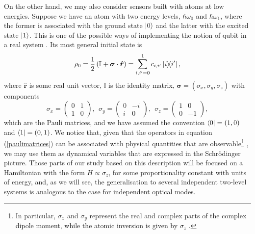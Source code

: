 On the other hand, we may also consider sensors built with atoms at low energies. Suppose we have an atom with two energy levels, $\hbar \omega_0$ and $\hbar \omega_1$, where the former is associated with the ground state $\ket{0}$ and the latter with the excited state $\ket{1}$. This is one of the possible ways of implementing the notion of qubit in a real system \cite{nielsen2010}. Its most general initial state is \cite{barnett2002}
\begin{equation}
\rho_0 = \frac{1}{2}\left(\mathbb{I} + \boldsymbol{\sigma}\cdot \boldsymbol{\hat{r}}\right) = \sum_{i, i'=0}^1 c_{i,i'} \ketbra{i}{i'},
\end{equation}
where $\boldsymbol{\hat{r}}$ is some real unit vector, $\mathbb{I}$ is the identity matrix, $\boldsymbol{\sigma} = (\sigma_x, \sigma_y, \sigma_z)$ with components
\begin{equation}
\sigma_x = \begin{pmatrix}
0 & 1 \\
1 & 0
\end{pmatrix}, ~~
\sigma_y = \begin{pmatrix}
0 & -i \\
i & 0
\end{pmatrix}, ~~
\sigma_z = \begin{pmatrix}
1 & 0 \\
0 & -1
\end{pmatrix},
\label{paulimatrices}
\end{equation}
which are the Pauli matrices, and we have assumed the convention $\bra{0} = (1, 0)$ and $\bra{1} = (0, 1)$. We notice that, given that the operators in equation (\ref{paulimatrices}) can be associated with physical quantities that are observable\footnote{In particular, $\sigma_x$ and $\sigma_y$ represent the real and complex parts of the complex dipole moment, while the atomic inversion is given by $\sigma_z$ \cite{barnett2002}.} \cite{barnett2002}, we may use them as dynamical variables that are expressed in the Schr\"{o}dinger picture. Those parts of our study based on this description will be focused on a Hamiltonian with the form $H \propto \sigma_z$, for some proportionality constant with units of energy, and, as we will see, the generalisation to several independent two-level systems is analogous to the case for independent optical modes. 

